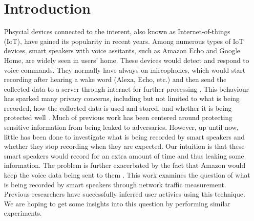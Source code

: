 \section{Introduction}
Phsycial devices connected to the interent, also known as Internet-of-things (IoT), have gained its popularity in recent years. Among numerous types of IoT devices, smart speakers with voice assitants, such as Amazon Echo and Google Home, are widely seen in users' home. These devices would detect and respond to voice commands. They normally have always-on mircophones, which would start recording after hearing a wake word (Alexa, Echo, etc.) and then send the collected data to a server through internet for further processing \cite{AmazonEc68:online}. This behaviour has sparked many privacy concerns, including but not limited to what is being recorded, how the collocted data is used and stored, and whether it is being protected well \cite{lau2018alexa, fowler_2019, apthorpe2017smart, apthorpe2019keeping, apthorpe2017spying}. Much of previous work has been centered around protecting sensitive information from being leaked to adversaries\cite{apthorpe2017smart, apthorpe2019keeping, apthorpe2017spying}. However, up until now, little has been done to investigate what is being recorded by smart speakers and whether they stop recording when they are expected. Our intuition is that these smart speakers would record for an extra amount of time and thus leaking some information. The problem is further exacerbated by the fact that Amazon would keep the voice data being sent to them \cite{kelly_statt_2019, osborne_2019}. This work examines the question of what is being recorded by smart speakers through network traffic measurement. Previous researchers \cite{apthorpe2017spying} have successfully inferred user activies using this technique. We are hoping to get some insights into this question by performing similar experiments.